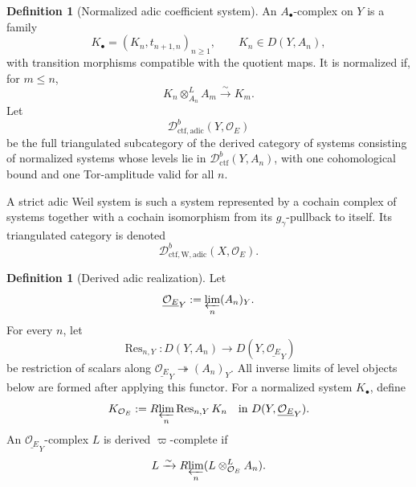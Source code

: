 \documentclass[10pt]{article}
\theoremstyle{definition}
\newtheorem{definition}[theorem]{Definition}
\newcommand{\OO}{\mathcal O}
\newcommand{\Dctf}{\mathcal D^b_{\mathrm{ctf}}}
\begin{document}
\begin{definition}[Normalized adic coefficient system]
An \(A_\bullet\)-complex on \(Y\) is a family
\[
 K_\bullet=(K_n,t_{n+1,n})_{n\geq1},\qquad
 K_n\in D(Y,A_n),
\]
with transition morphisms compatible with the quotient maps.  It is
normalized if, for \(m\leq n\),
\[
 K_n\otimes_{A_n}^LA_m\xrightarrow{\sim}K_m.
\]
Let
\[
 \mathcal D^b_{\mathrm{ctf,adic}}(Y,\OO_E)
\]
be the full triangulated subcategory of the derived category of systems
consisting of normalized systems whose levels lie in \(\Dctf(Y,A_n)\),
with one cohomological bound and one Tor-amplitude valid for all \(n\).

A strict adic Weil system is such a system represented by a cochain complex
of systems together with a cochain isomorphism from its
\(g_\gamma\)-pullback to itself.  Its triangulated category is denoted
\[
 \mathcal D^b_{\mathrm{ctf,W,adic}}(X,\OO_E).
\]
\end{definition}

\begin{definition}[Derived adic realization]
Let
\[
 \underline{\OO_E}_Y:=\varprojlim_n(A_n)_Y.
\]
For every \(n\), let
\[
 \operatorname{Res}_{n,Y}:D(Y,A_n)\longrightarrow
 D(Y,\underline{\OO_E}_Y)
\]
be restriction of scalars along
\(\underline{\OO_E}_Y\twoheadrightarrow(A_n)_Y\).  All inverse limits of
level objects below are formed after applying this functor.
For a normalized system \(K_\bullet\), define
\[
 K_{\OO_E}:=R\!\varprojlim_n\operatorname{Res}_{n,Y}K_n
 \quad\text{in }D(Y,\underline{\OO_E}_Y).
\]
An \(\underline{\OO_E}_Y\)-complex \(L\) is derived
\(\varpi\)-complete if
\[
 L\xrightarrow{\sim}
 R\!\varprojlim_n(L\otimes_{\OO_E}^LA_n).
\]
\end{definition}
\end{document}
